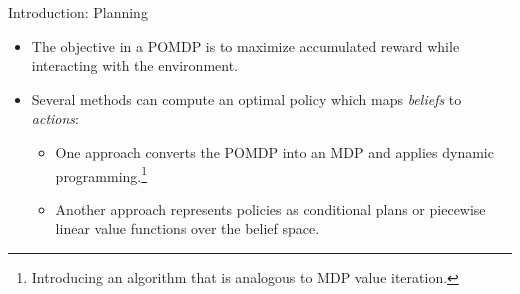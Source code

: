 \begin{frame}[fragile]{Introduction: Planning}

\begin{itemize}
    \item The objective in a POMDP is to maximize accumulated reward while interacting with the environment.
    \item Several methods can compute an optimal policy which maps \textit{beliefs} to \textit{actions}:
    \begin{itemize}
         \item One approach converts the POMDP into an MDP and applies dynamic programming.\footnote{Introducing an algorithm that is analogous to MDP value iteration.}
         \item Another approach represents policies as conditional plans or piecewise linear value functions over the belief space.
     \end{itemize} 
\end{itemize}

\end{frame}